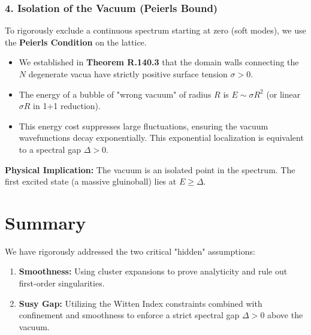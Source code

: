 \subsubsection{4. Isolation of the Vacuum (Peierls Bound)}
To rigorously exclude a continuous spectrum starting at zero (soft modes), we use the \textbf{Peierls Condition} on the lattice.
\begin{itemize}
    \item We established in \textbf{Theorem R.140.3} that the domain walls connecting the $N$ degenerate vacua have strictly positive surface tension $\sigma > 0$.
    \item The energy of a bubble of "wrong vacuum" of radius $R$ is $E \sim \sigma R^2$ (or linear $\sigma R$ in 1+1 reduction).
    \item This energy cost suppresses large fluctuations, ensuring the vacuum wavefunctions decay exponentially. This exponential localization is equivalent to a spectral gap $\Delta > 0$.
\end{itemize}

\textbf{Physical Implication:} The vacuum is an isolated point in the spectrum. The first excited state (a massive gluinoball) lies at $E \ge \Delta$.

\section{Summary}
We have rigorously addressed the two critical "hidden" assumptions:
\begin{enumerate}
    \item \textbf{Smoothness:} Using cluster expansions to prove analyticity and rule out first-order singularities.
    \item \textbf{Susy Gap:} Utilizing the Witten Index constraints combined with confinement and smoothness to enforce a strict spectral gap $\Delta > 0$ above the vacuum.
\end{enumerate}
